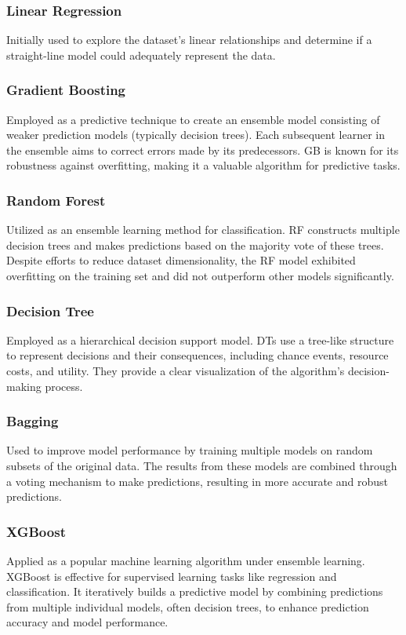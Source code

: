 \documentclass[conference]{IEEEtran}
\begin{document}
    \subsubsection{Linear Regression}
        Initially used to explore the dataset's linear relationships and determine if a straight-line model could adequately represent the data.

    \subsubsection{Gradient Boosting}
        Employed as a predictive technique to create an ensemble model consisting of weaker prediction models (typically decision trees). Each subsequent learner in the ensemble aims to correct errors made by its predecessors. GB is known for its robustness against overfitting, making it a valuable algorithm for predictive tasks.

    \subsubsection{Random Forest}
        Utilized as an ensemble learning method for classification. RF constructs multiple decision trees and makes predictions based on the majority vote of these trees. Despite efforts to reduce dataset dimensionality, the RF model exhibited overfitting on the training set and did not outperform other models significantly.

    \subsubsection{Decision Tree}
        Employed as a hierarchical decision support model. DTs use a tree-like structure to represent decisions and their consequences, including chance events, resource costs, and utility. They provide a clear visualization of the algorithm's decision-making process.

    \subsubsection{Bagging}
        Used to improve model performance by training multiple models on random subsets of the original data. The results from these models are combined through a voting mechanism to make predictions, resulting in more accurate and robust predictions.

    \subsubsection{XGBoost}
        Applied as a popular machine learning algorithm under ensemble learning. XGBoost is effective for supervised learning tasks like regression and classification. It iteratively builds a predictive model by combining predictions from multiple individual models, often decision trees, to enhance prediction accuracy and model performance.
\end{document}
